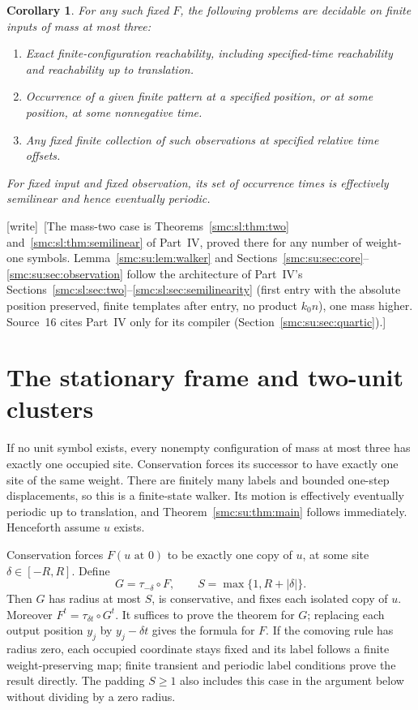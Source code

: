 \documentclass[11pt,letterpaper]{article}
\numberwithin{equation}{section}
\newtheorem{corollary}[theorem]{Corollary}
\theoremstyle{definition}
\theoremstyle{remark}
\newcommand{\wtag}{\textup{[write]}}
\begin{document}
\begin{corollary}\label{smc:su:cor:decision}
For any such fixed $F$, the following problems are decidable on finite inputs
of mass at most three:
\begin{enumerate}
\item Exact finite-configuration reachability, including specified-time
reachability and reachability up to translation.
\item Occurrence of a given finite pattern at a specified position, or at some
position, at some nonnegative time.
\item Any fixed finite collection of such observations at specified relative
time offsets.
\end{enumerate}
For fixed input and fixed observation, its set of occurrence times is effectively
semilinear and hence eventually periodic.
\end{corollary}

\wtag\ [The mass-two case is Theorems~\ref{smc:sl:thm:two} and~\ref{smc:sl:thm:semilinear} of Part~IV, proved there for any number of weight-one symbols. Lemma~\ref{smc:su:lem:walker} and Sections~\ref{smc:su:sec:core}--\ref{smc:su:sec:observation} follow the architecture of Part~IV's Sections~\ref{smc:sl:sec:two}--\ref{smc:sl:sec:semilinearity} (first entry with the absolute position preserved, finite templates after entry, no product $k_0n$), one mass higher. Source~16 cites Part~IV only for its compiler (Section~\ref{smc:su:sec:quartic}).]

\section{The stationary frame and two-unit clusters}\label{smc:su:sec:frame}

If no unit symbol exists, every nonempty configuration of mass at most three
has exactly one occupied site. Conservation forces its successor to have exactly
one site of the same weight. There are finitely many labels and bounded
one-step displacements, so this is a finite-state walker. Its motion is
effectively eventually periodic up to translation, and Theorem~\ref{smc:su:thm:main}
follows immediately. Henceforth assume $u$ exists.

Conservation forces $F(u\text{ at }0)$ to be exactly one copy of $u$, at some
site $\delta\in[-R,R]$. Define
\[
 G=\tau_{-\delta}\circ F,\qquad S=\max\{1,R+|\delta|\}.
\]
Then $G$ has radius at most $S$, is conservative, and fixes each isolated copy
of $u$. Moreover $F^t=\tau_{\delta t}\circ G^t$. It suffices to prove the theorem
for $G$; replacing each output position $y_j$ by $y_j-\delta t$ gives the formula
for $F$.
If the comoving rule has radius zero, each occupied coordinate stays fixed and
its label follows a finite weight-preserving map; finite transient and periodic
label conditions prove the result directly. The padding $S\ge1$ also includes
this case in the argument below without dividing by a zero radius.
\end{document}
